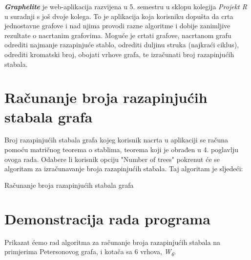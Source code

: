 \documentclass[times, utf8, zavrsni]{fer}
\begin{document}
\textit{\textbf{Graphelite}} je web-aplikacija razvijena u 5. semestru u sklopu kolegija \textit{Projekt R} u suradnji s još dvoje kolega. To je aplikacija koja korisniku dopušta da crta jednostavne grafove i nad njima provodi razne algoritme i dobije zanimljive rezultate o nacrtanim grafovima. Moguće je crtati grafove, nacrtanom grafu odrediti najmanje razapinjuće stablo, odrediti duljinu struka (najkraći ciklus), odrediti kromatski broj, obojati vrhove grafa, te izračunati broj razapinjućih stabala.

\section{Računanje broja razapinjućih stabala grafa}

Broj razapinjućih stabala grafa kojeg korisnik nacrta u aplikaciji se računa pomoću matričnog teorema o stablima, teorema koji je obrađen u 4. poglavlju ovoga rada. Odabere li korisnik opciju "Number of trees" pokrenut će se algoritam za izračunavanje broja razapinjućih stabala. Taj algoritam je sljedeći:

\begin{algorithm}
	\caption{Računanje broja razapinjućih stabala grafa}
	\label{algo:spanning-trees}
	\begin{algorithmic}
						\ENDIF
					\ENDFOR
				\ELSE
				\ENDIF
			\ENDFOR
		\ENDFOR
	\end{algorithmic}
\end{algorithm}

\newpage

\section{Demonstracija rada programa}

Prikazat ćemo rad algoritma za računanje broja razapinjućih stabala na primjerima Petersonovog grafa, i kotača sa 6 vrhova, \textit{W\textsubscript{6}}.
\end{document}
